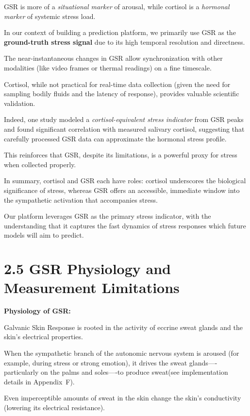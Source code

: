 GSR is more of a \textit{situational marker} of arousal, while cortisol is a \textit{hormonal marker} of systemic stress load.

In our context of building a prediction platform, we primarily use GSR as the \textbf{ground-truth stress signal}
 due to its high temporal resolution and directness.

The near-instantaneous changes in GSR allow synchronization with other modalities (like video frames or thermal readings) on a fine timescale.

Cortisol, while not practical for real-time data collection (given the need for sampling bodily fluids and the latency of response), provides valuable scientific validation.

Indeed, one study modeled a \textit{cortisol-equivalent stress indicator} from GSR peaks and found significant correlation with measured salivary cortisol, suggesting that carefully processed GSR data can approximate the hormonal stress profile.

This reinforces that GSR, despite its limitations, is a powerful proxy for stress when collected properly.

In summary, cortisol and GSR each have roles: cortisol underscores the biological significance of stress, whereas GSR offers an accessible, immediate window into the sympathetic activation that accompanies stress.

Our platform leverages GSR as the primary stress indicator, with the understanding that it captures the fast dynamics of stress responses which future models will aim to predict.

\section{2.5 GSR Physiology and Measurement Limitations}

 \textbf{Physiology of GSR:}

Galvanic Skin Response is rooted in the activity of eccrine sweat glands and the skin's electrical properties.

When the sympathetic branch of the autonomic nervous system is aroused (for example, during stress or strong emotion), it drives the sweat glands----particularly on the palms and soles----to produce sweat(see implementation details in Appendix~F).

Even imperceptible amounts of sweat in the skin change the skin's conductivity (lowering its electrical resistance).

